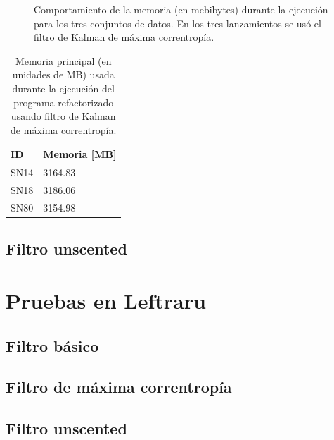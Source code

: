 \begin{figure}[h!]
\centering
{}\hfill
{}\vfill
{}
\caption{Comportamiento de la memoria (en mebibytes) durante la ejecuci\'on para los tres conjuntos de datos. En los tres lanzamientos se us\'o el filtro de Kalman de m\'axima correntrop\'ia.}
\label{fig:mem_new_kbf}
\end{figure}

\begin{table}[h!]
\centering
\begin{tabular}{|l|l|}
\hline
\textbf{ID} & Memoria [MB]\\\hline\hline
SN14 & 3164.83\\\hline
SN18 & 3186.06\\\hline
SN80 & 3154.98\\\hline
\end{tabular}
\caption{Memoria principal (en unidades de MB) usada durante la ejecuci\'on del programa refactorizado usando filtro de Kalman de m\'axima correntrop\'ia.}
\label{tab:mem4}
\end{table}

\subsection{Filtro unscented}
\section{Pruebas en Leftraru}
\subsection{Filtro b\'asico}
\subsection{Filtro de m\'axima correntrop\'ia}
\subsection{Filtro unscented}
